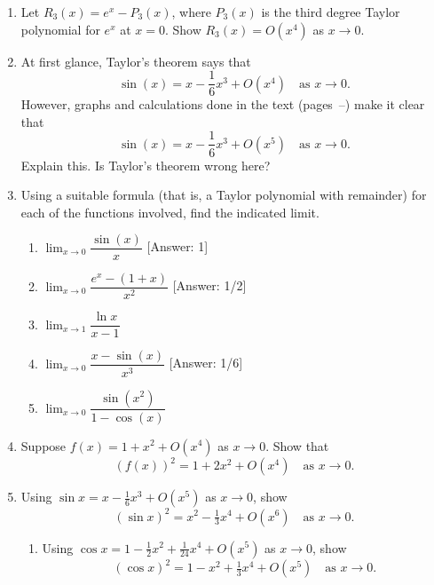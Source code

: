 \begin{enumerate}
\begin{enumerate}
\end{enumerate}
\item Let $R_3(x) = e^x - P_3(x)$, where $P_3(x)$ is the third degree
Taylor polynomial for $e^x$ at $x=0$.  Show $R_3(x) = O(x^4)$ as $x
\rightarrow 0$.


\item At first glance, Taylor's theorem says that
\[
\sin(x) = x - \dfrac{1}{6} x^3 + O(x^4) \quad \mbox{as } x \rightarrow 0.
\] 
However, graphs and calculations done in the text
(pages~\pageref{startsine}--\pageref{endsine}) make it clear that
\[
\sin(x) = x - \dfrac{1}{6} x^3 + O(x^5) \quad \mbox{as } x \rightarrow 0.
\]
Explain this.  Is Taylor's theorem wrong here?


\item Using a suitable formula (that is, a Taylor polynomial with
remainder) for each of the functions involved, find the indicated limit.

  \begin{enumerate}
  \item ${\displaystyle \lim_{x \to 0} \dfrac{\sin(x)}{x}}$ \hfill [Answer: 1]


  \item ${\displaystyle \lim_{x \to 0} \dfrac{e^x - (1 + x)}{x^2}}$ \hfill
[Answer: 1/2]


  \item ${\displaystyle \lim_{x \to 1} \dfrac{\ln{x}}{x - 1}}$


  \item ${\displaystyle \lim_{x \to 0} \dfrac{x - \sin(x)}{x^3}}$ \hfill
[Answer: 1/6]


  \item ${\displaystyle \lim_{x \to 0} \dfrac{\sin(x^2)}{1 - \cos(x)}}$


\end{enumerate}
\item Suppose $f(x) = 1 + x^2 + O(x^4)$ as $x \rightarrow 0$.  Show
that
\[
(f(x))^2 = 1 + 2x^2 + O(x^4) \quad \mbox{as } x \rightarrow 0.
\]


\item Using $\sin x = x - \tfrac{1}{6} x^3 + O(x^5)$ as $x \rightarrow
0$, show
\[
(\sin x)^2 = x^2 - \tfrac{1}{3} x^4 + O(x^6) \quad \mbox{as } x \rightarrow 0.
\]


  \begin{enumerate}
  \item Using $\cos x = 1 - \tfrac{1}{2} x^2 + \tfrac{1}{24} x^4 +
O(x^5)$ as $x \rightarrow 0$, show
\[
(\cos x)^2 = 1 - x^2 + \tfrac{1}{3} x^4 + O(x^5) \quad \mbox{as } 
x \rightarrow 0.
\]



\end{enumerate}
\end{enumerate}
